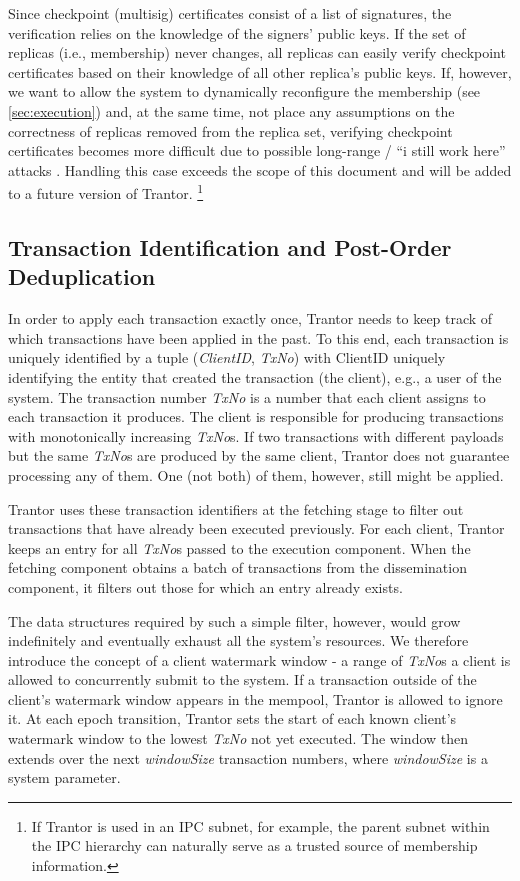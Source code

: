 \documentclass{article}
\begin{document}
Since checkpoint (multisig) certificates consist of a list of signatures, the verification relies on the knowledge of the signers’ public keys.
If the set of replicas (i.e., membership) never changes, all replicas can easily verify checkpoint certificates
based on their knowledge of all other replica’s public keys.
If, however, we want to allow the system to dynamically reconfigure the membership (see \cref{sec:execution})
and, at the same time, not place any assumptions on the correctness of replicas removed from the replica set,
verifying checkpoint certificates becomes more difficult due to possible long-range / ``i still work here'' attacks \cite{longrangeattacks}.
Handling this case exceeds the scope of this document and will be added to a future version of Trantor.%
\footnote{If Trantor is used in an IPC \cite{ipc} subnet, for example, the parent subnet within the IPC hierarchy can naturally serve as a trusted source of membership information.}

\subsection{Transaction Identification and Post-Order Deduplication}
\label{sec:tx-deduplication}

In order to apply each transaction exactly once, Trantor needs to keep track of which transactions have been applied in the past.
To this end, each transaction is uniquely identified by a tuple (\textit{ClientID}, \textit{TxNo})
with ClientID uniquely identifying the entity that created the transaction (the client), e.g., a user of the system.
The transaction number \textit{TxNo} is a number that each client assigns to each transaction it produces.
The client is responsible for producing transactions with monotonically increasing \textit{TxNo}s.
If two transactions with different payloads but the same \textit{TxNo}s are produced by the same client,
Trantor does not guarantee processing any of them.
One (not both) of them, however, still might be applied.

Trantor uses these transaction identifiers at the fetching stage to filter out transactions that have already been executed previously.
For each client, Trantor keeps an entry for all \textit{TxNo}s passed to the execution component.
When the fetching component obtains a batch of transactions from the dissemination component, it filters out those for which an entry already exists.

The data structures required by such a simple filter, however, would grow indefinitely and eventually exhaust all the system’s resources.
We therefore introduce the concept of a client watermark window - a range of \textit{TxNo}s a client is allowed to concurrently submit to the system.
If a transaction outside of the client’s watermark window appears in the mempool, Trantor is allowed to ignore it.
At each epoch transition, Trantor sets the start of each known client’s watermark window to the lowest \textit{TxNo} not yet executed.
The window then extends over the next \textit{windowSize} transaction numbers, where \textit{windowSize} is a system parameter.
\end{document}
